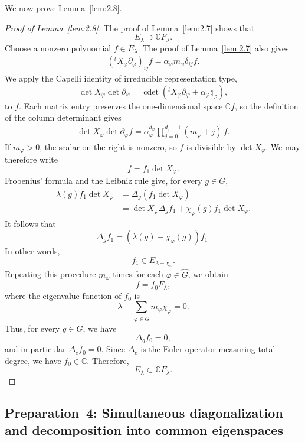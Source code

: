 \documentclass[12pt,a4paper]{article}
\theoremstyle{definition}
\numberwithin{definition}{section}
\DeclareMathOperator{\Cdet}{cdet}
\begin{document}
We now prove Lemma~\ref{lem:2.8}.

\begin{proof}[Proof of Lemma~\ref{lem:2.8}]
The proof of Lemma~\ref{lem:2.7} shows that
\[
 E_\lambda
 \supset
 \mathbb{C} F_{\lambda}.
\]
Choose a nonzero polynomial $f\in E_\lambda$.
The proof of Lemma~\ref{lem:2.7} also gives
\begin{align*}
 ({}^tX_\varphi\partial_\varphi)_{ij}f
 =
 \alpha_\varphi
 m_\varphi\delta_{ij}f.
\end{align*}
We apply the Capelli identity of irreducible representation type,
\[
\det{X_{\varphi}} \det{\partial_{\varphi}} = \Cdet{\left( {}^t X_{\varphi} \partial_{\varphi} + \alpha_{\varphi} \natural_{\varphi} \right)},
\]
to $f$.
Each matrix entry preserves the one-dimensional space $\mathbb Cf$,
so the definition of the column determinant gives
\begin{align*}
\det{X_{\varphi}} \det{\partial_{\varphi}} f
=
\alpha_\varphi^{d_\varphi}
\prod_{j=0}^{d_\varphi-1}
(m_\varphi+j)\,f.
\end{align*}
If $m_\varphi>0$, the scalar on the right is nonzero,
so $f$ is divisible by $\det X_\varphi$.
We may therefore write
\[
 f = f_{1} \det{X_{\varphi}}.
\]
Frobenius' formula and the Leibniz rule give, for every $g\in G$,
\[
\begin{aligned}
\lambda(g) f_{1} \det{X_{\varphi}}
&= \Delta_{g}(f_{1} \det{X_{\varphi}})\\
&= \det{X_{\varphi}} \Delta_{g} f_{1} + \chi_{\varphi}(g) f_{1} \det{X_{\varphi}}.
\end{aligned}
\]
It follows that
\[
\Delta_{g} f_{1} = (\lambda(g) - \chi_{\varphi}(g)) f_{1}.
\]
In other words,
\[
 f_1 \in E_{\lambda-\chi_\varphi}.
\]
Repeating this procedure $m_\varphi$ times for each $\varphi\in\widehat G$, we obtain
\[
f
=
f_{0} F_{\lambda},
\]
where the eigenvalue function of $f_0$ is
\[
\lambda - \sum_{\varphi \in \widehat{G}} m_{\varphi} \chi_{\varphi} = 0.
\]
Thus, for every $g\in G$, we have
\[
 \Delta_{g} f_{0} = 0,
\]
and in particular $\Delta_e f_0=0$.
Since $\Delta_e$ is the Euler operator measuring total degree,
we have $f_0\in\mathbb C$.
Therefore,
\[
 E_\lambda
 \subset
 \mathbb{C} F_{\lambda}.
\]
\end{proof}

\subsection{Preparation~4: Simultaneous diagonalization and decomposition into common eigenspaces}\label{sec:2.4}
\end{document}
